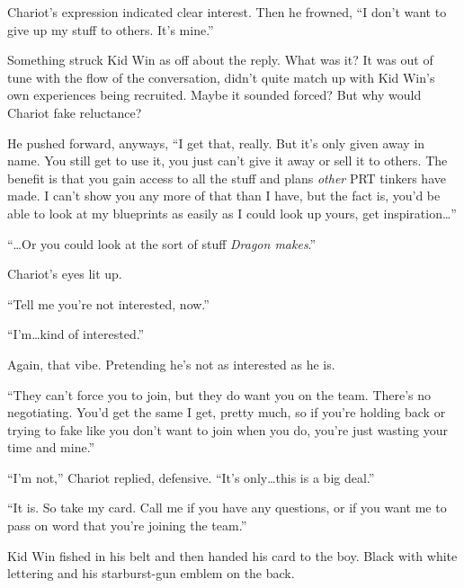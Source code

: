 Chariot's expression indicated clear interest.  Then he frowned, ``I don't want to give up my stuff to others.  It's mine.''



Something struck Kid Win as off about the reply.  What was it?   It was out of tune with the flow of the conversation, didn't quite match up with Kid Win's own experiences being recruited.  Maybe it sounded forced?  But why would Chariot fake reluctance?



He pushed forward, anyways, ``I get that, really.  But it's only given away in name.  You still get to use it, you just can't give it away or sell it to others.  The benefit is that you gain access to all the stuff and plans \emph{other} PRT tinkers have made.  I can't show you any more of that than I have, but the fact is, you'd be able to look at my blueprints as easily as I could look up yours, get inspiration\ldots''



``\ldots{}Or you could look at the sort of stuff \emph{Dragon makes}.''



Chariot's eyes lit up.



``Tell me you're not interested, now.''



``I'm\ldots kind of interested.''



Again, that vibe.  Pretending he's not as interested as he is.



``They can't force you to join, but they do want you on the team.  There's no negotiating.  You'd get the same I get, pretty much, so if you're holding back or trying to fake like you don't want to join when you do, you're just wasting your time and mine.''



``I'm not,'' Chariot replied, defensive.  ``It's only\ldots this is a big deal.''



``It is.  So take my card.  Call me if you have any questions, or if you want me to pass on word that you're joining the team.''



Kid Win fished in his belt and then handed his card to the boy.  Black with white lettering and his starburst-gun emblem on the back.




